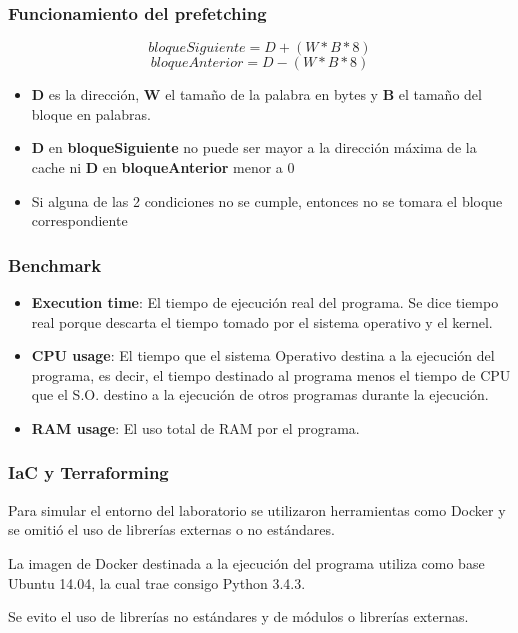 \documentclass[11pt]{beamer}
\begin{document}
	\begin{frame}
		\frametitle{Funcionamiento del prefetching}
		
		\begin{equation}
			bloqueSiguiente = D + (W * B * 8)
		\end{equation}
		\begin{equation}
			bloqueAnterior = D - (W * B * 8)
		\end{equation}
		
		\begin{itemize}
			\item \textbf{D} es la dirección, \textbf{W} el tamaño de la palabra en bytes y \textbf{B} el tamaño del bloque en palabras.
			\item \textbf{D} en \textbf{bloqueSiguiente} no puede ser mayor a la dirección máxima de la cache ni \textbf{D} en \textbf{bloqueAnterior} menor a 0
			\item Si alguna de las 2 condiciones no se cumple, entonces no se tomara el bloque correspondiente
		\end{itemize}
	\end{frame}
	
	\begin{frame}
		\frametitle{Benchmark}
		\begin{itemize}
			\item \textbf{Execution time}: El tiempo de ejecución real del programa. Se dice tiempo real porque descarta el tiempo tomado por el sistema operativo y el kernel.
			
			\item \textbf{CPU usage}: El tiempo que el sistema Operativo destina a la ejecución del programa, es decir, el tiempo destinado al programa menos el tiempo de CPU que el S.O. destino a la ejecución de otros programas durante la ejecución.
			
			\item  \textbf{RAM usage}: El uso total de RAM por el programa.
		\end{itemize}
	\end{frame}
	
	\begin{frame}
		\frametitle{IaC y Terraforming}
		Para simular el entorno del laboratorio se utilizaron herramientas como Docker y se omitió el uso de librerías externas o no estándares.
		
		La imagen de Docker destinada a la ejecución del programa utiliza como base Ubuntu 14.04, la cual trae consigo Python 3.4.3.
		
		Se evito el uso de librerías no estándares y de módulos o librerías externas.
	\end{frame}
\end{document}
